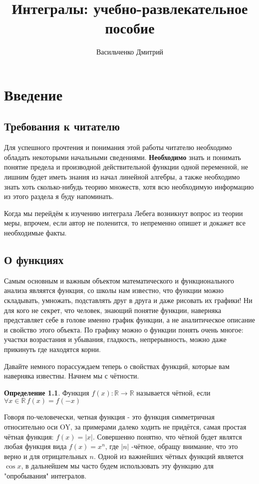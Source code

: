 \documentclass{book} %
\title{Интегралы: учебно-развлекательное пособие}
\author{Васильченко Дмитрий}
\date{} %
\theoremstyle{definition}
\newtheorem{definition}{Определение}[chapter]
\theoremstyle{remark}
\begin{document}
	
	
	\maketitle %
	
	\tableofcontents
	
	\chapter{Введение}
	\section{Требования к читателю}
		\par
		Для успешного прочтения и понимания этой работы читателю необходимо обладать некоторыми начальными сведениями. \textbf{Необходимо} знать и понимать понятие предела и производной действительной функции одной переменной, не лишним будет иметь знания из начал линейной алгебры, а также необходимо знать хоть сколько-нибудь теорию множеств, хотя всю необходимую информацию из этого раздела я буду напоминать. 
		
		Когда мы перейдём к изучению интеграла Лебега возникнут вопрос из теории меры, впрочем, если автор не поленится, то непременно опишет и докажет все необходимые факты.
	\section{О функциях}
		\par
		Самым основным и важным объектом математического и функционального анализа являятся функция, со школы нам известно, что функции можно складывать, умножать, подставлять друг в друга и даже рисовать их графики! Ни для кого не секрет, что человек, знающий понятие функции, наверняка представляет себе в голове именно график функции, а не аналитическое описание и свойство этого объекта. По графику можно о функции понять очень многое: участки возрастания и убывания, гладкость, непрерывность, можно даже прикинуть где находятся корни. 
		
		Давайте немного порассуждаем теперь о свойствах функций, которые вам наверняка известны. Начнем мы с чётности.
		\begin{definition}
			Функция $f(x): \mathbb{R} \to \mathbb{R}$ называется чётной, если $\forall x \in \mathbb{R} \, f(x) = f(-x)$
		\end{definition}
		Говоря по-человечески, четная функция - это функция симметричная относительно оси OY, за примерами далеко ходить не придётся, самая простая чётная функция: $f(x) = |x|$. Совершенно понятно, что чётной будет являтся любая функция вида $f(x) = x^n$, где $|n|$ -чётное, обращу внимание, что это верно и для отрицательных $n$. Одной из важнейших чётных функций является $\cos{x}$, в дальнейшем мы часто будем использовать эту функцию для "опробывания" интегралов.
		
\end{document}
